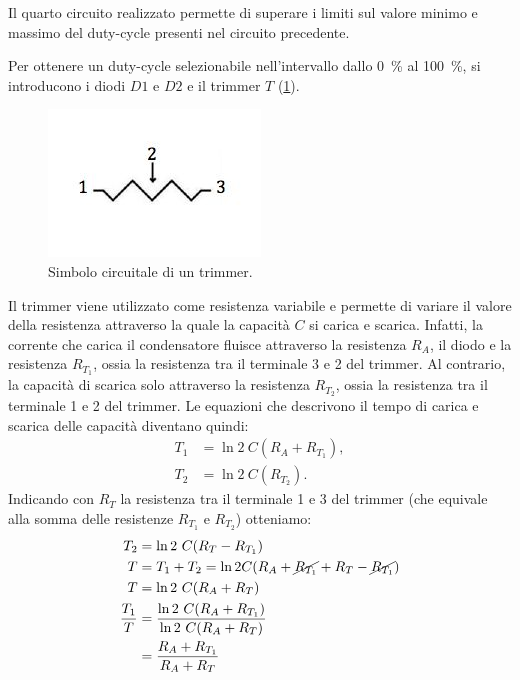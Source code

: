 \clearpage
Il quarto circuito realizzato permette di superare i limiti sul valore minimo e massimo del duty-cycle presenti nel circuito precedente. 

\noindent
Per ottenere un duty-cycle selezionabile nell'intervallo dallo \SI{0}{\percent} al \SI{100}{\percent}, si introducono i diodi $D1$ e $D2$ e il trimmer $T$ (\Fig\ref{fig:trimmer}).
\begin{figure}[tbh]
	\centering
	\includegraphics[width=0.2\linewidth]{./ImageFiles/Laboratorio 5/trimmer.jpg}
	\caption{Simbolo circuitale di un trimmer.}
	\label{fig:trimmer}
\end{figure}
Il trimmer viene utilizzato come resistenza variabile e permette di variare il valore della resistenza attraverso la quale la capacità $C$ si carica e scarica. Infatti, la corrente che carica il condensatore fluisce attraverso la resistenza $R_A$, il diodo e la resistenza $R_{T_1}$, ossia la resistenza tra il terminale 3 e 2 del trimmer. Al contrario, la capacità di scarica solo attraverso la resistenza $R_{T_2}$, ossia la resistenza tra il terminale 1 e 2 del trimmer. Le equazioni che descrivono il tempo di carica e scarica delle capacità diventano quindi:
\begin{equation}
	\begin{split}
		T_1&=\ln{2}\ C (R_A+R_{T_1}), \\
		T_2&=\ln{2}\ C(R_{T_2}).
	\end{split}
\end{equation}
Indicando con $R_T$ la resistenza tra il terminale 1 e 3 del trimmer (che equivale alla somma delle resistenze $R_{T_1}$ e $R_{T_2}$) otteniamo:
\begin{equation}
	\begin{split}
		T_2&=\ln{2}\ C(R_T-R_{T_1}) \\
		T&=T_1+T_2=\ln{2} C(R_A+\cancel{R_{T_1}}+R_T-\cancel{R_{T_1}}) \\
		T&=\ln{2}\ C(R_A+R_T) \\
		\frac{T_1}{T}&=\frac{\ln{2}\ C (R_A+R_{T_1})}{\ln{2}\ C(R_A+R_T)} \\
		&=\frac{R_A+R_{T_1}}{R_A+R_T}
	\end{split}
\end{equation}